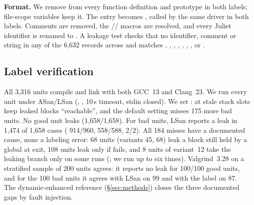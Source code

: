 \noindent\textbf{Format.}
We remove  from every function definition and prototype in both labels; file-scope variables keep it.
The entry becomes , called by the same driver  in both labels.
Comments are removed, the // macros are resolved, and every Juliet identifier is renamed to .
A leakage test checks that no identifier, comment or string in any of the 6,632 records across \Deb{} and \Orig{} matches , , , , , , ,  or . %

\subsection{Label verification}
\label{sec:verify}
All 3,316 \Deb{} units compile and link with both GCC~13 and Clang~23. %
We run every unit under ASan/LSan (, , 10\,s timeout, stdin closed).
We set : at  stale stack slots keep leaked blocks ``reachable'', and the default setting misses 175 more bad units. %
No good unit leaks (1,658/1,658).
For bad units, LSan reports a leak in 1,474 of 1,658 cases ( 914/960,  558/588,  2/2). %
All 184 misses have a documented cause, none a labeling error: 68 units (variants 45, 68) leak a block still held by a global at exit, 108  units leak only if  fails, and 8 units of variant~12 take the leaking branch only on some runs (; we run up to six times).
Valgrind~3.28 on a stratified sample of 200 units agrees: it reports no leak for 100/100 good units, and for the 100 bad units it agrees with LSan on 99 and with the label on 87. %
The dynamic-enhanced reference (\S\ref{sec:methods}) closes the three documented gaps by fault injection.

